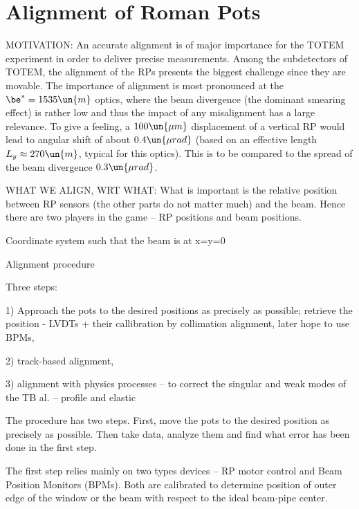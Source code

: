 \chapter[al]{Alignment of Roman Pots}


MOTIVATION: An accurate alignment is of major importance for the TOTEM experiment in order to deliver precise measurements. Among the subdetectors of TOTEM, the alignment of the RPs presents the biggest challenge since they are movable. The importance of alignment is most pronounced at the $\be^* = 1535\un{m}$ optics, where the beam divergence (the dominant smearing effect) is rather low and thus the impact of any misalignment has a large relevance. To give a feeling, a $100\un{\mu m}$ displacement of a vertical RP would lead to angular shift of about $0.4\un{\mu rad}$ (based on an effective length $L_y\approx 270\un{m}$, typical for this optics). This is to be compared to the spread of the beam divergence $0.3\un{\mu rad}$.


WHAT WE ALIGN, WRT WHAT:
What is important is the relative position between RP sensors (the other parts do not matter much) and the beam. Hence there are two players in the game -- RP positions and beam positions.

Coordinate system such that the beam is at x=y=0

\caption{Alignment procedure}

Three steps:

1) Approach the pots to the desired positions as precisely as possible; retrieve the position - LVDTs + their callibration by collimation alignment, later hope to use BPMs, 

2) track-based alignment, 

3) alignment with physics processes -- to correct the singular and weak modes of the TB al. -- profile  and elastic 

\iffalse
The procedure has two steps. First, move the pots to the desired position as precisely as possible. Then take data, analyze them and find what error has been done in the first step.

The first step relies mainly on two types devices -- RP motor control and Beam Position Monitors (BPMs). Both are calibrated to determine position of outer edge of the window or the beam with respect to the ideal beam-pipe center.

